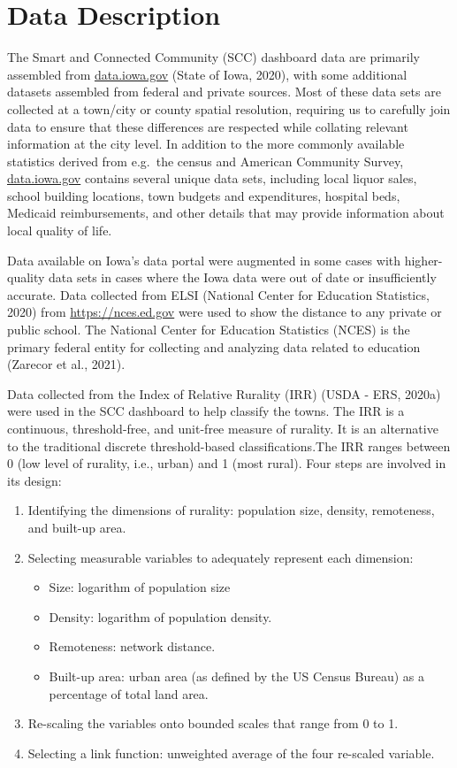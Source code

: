 \documentclass[print]{nuthesis}
\begin{document}
\section{Data Description}

The Smart and Connected Community (SCC) dashboard data are primarily assembled from \url{data.iowa.gov} (State of Iowa, 2020), with some additional datasets assembled from federal and private sources. Most of these data sets are collected at a town/city or county spatial resolution, requiring us to carefully join data to ensure that these differences are respected while collating relevant information at the city level. In addition to the more commonly available statistics derived from e.g.~the census and American Community Survey, \url{data.iowa.gov} contains several unique data sets, including local liquor sales, school building locations, town budgets and expenditures, hospital beds, Medicaid reimbursements, and other details that may provide information about local quality of life.

Data available on Iowa's data portal were augmented in some cases with higher-quality data sets in cases where the Iowa data were out of date or insufficiently accurate.
Data collected from ELSI (National Center for Education Statistics, 2020) from \url{https://nces.ed.gov} were used to show the distance to any private or public school. The National Center for Education Statistics (NCES) is the primary federal entity for collecting and analyzing data related to education (Zarecor et al., 2021).

Data collected from the Index of Relative Rurality (IRR) (USDA - ERS, 2020a) were used in the SCC dashboard to help classify the towns. The IRR is a continuous, threshold-free, and unit-free measure of rurality. It is an alternative to the traditional discrete threshold-based classifications.The IRR ranges between 0 (low level of rurality, i.e., urban) and 1 (most rural). Four steps are involved in its design:

\begin{enumerate}
\item Identifying the dimensions of rurality: population size, density, remoteness, and built-up area.
\item Selecting measurable variables to adequately represent each dimension:
    \begin{itemize}
        \item Size: logarithm of population size
        \item Density: logarithm of population density.
        \item Remoteness: network distance.
        \item Built-up area: urban area (as defined by the US Census Bureau) as a percentage of total land area.
    \end{itemize}
\item Re-scaling the variables onto bounded scales that range from 0 to 1.
\item Selecting a link function: unweighted average of the four re-scaled variable.
\end{enumerate}
\end{document}
